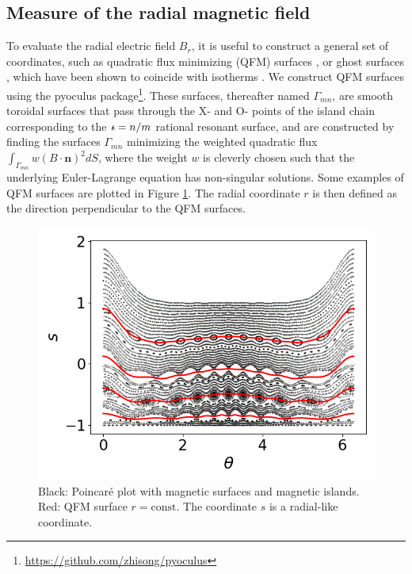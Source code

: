 \documentclass[my_thesis.tex]{subfiles}
\begin{document}
\subsection{Measure of the radial magnetic field} \label{sec. measure b r}
To evaluate the radial electric field $ B_r$, it is useful to construct a general set of coordinates, such as quadratic flux minimizing (QFM) surfaces \citep{dewarAlmostInvariantManifolds1994, hudsonAlmostinvariantSurfacesMagnetic1996, hudsonConstructionIntegrableField1998}, or ghost surfaces \citep{hudsonAreGhostSurfaces2009}, which have been shown to coincide with isotherms \citep{Hudson2008}. We construct QFM surfaces  using the pyoculus package\footnote{\url{https://github.com/zhisong/pyoculus}}. These surfaces, thereafter named $\Gamma_{mn}$, are smooth toroidal surfaces that pass through the X- and O- points of the island chain corresponding to the $\text{$\iota\!\!$-}=n/m$ rational resonant surface, and are constructed by finding the surfaces $\Gamma_{mn}$ minimizing the weighted quadratic flux $\int_{\Gamma_{mn}} w (B\cdot\mathbf{n})^2 dS$, where the weight $w$ is cleverly chosen such that the underlying Euler-Lagrange equation has non-singular solutions. Some examples of QFM surfaces are plotted in Figure \ref{fig.qfms_example}. The radial coordinate $r$ is then defined as the direction perpendicular to the QFM surfaces.

\begin{figure}
	\centering
	\includegraphics[width=.75\linewidth]{images/QFMS_example.png}
	\caption{Black: Poincar\'e plot with magnetic surfaces and magnetic islands. Red: QFM surface $r=\text{const}$. The coordinate $s$ is a radial-like coordinate.}
	\label{fig.qfms_example}
\end{figure}
\end{document}
